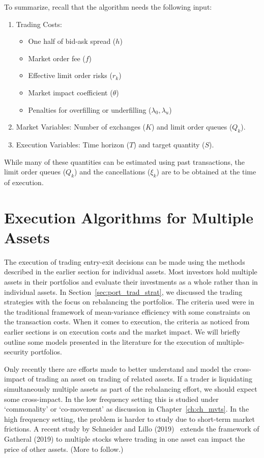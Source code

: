 To summarize, recall that the algorithm needs the following input:
	\begin{enumerate}[--]
	\item Trading Costs: 
		\begin{itemize}
		\item One half of bid-ask spread ($h$)
		\item Market order fee ($f$)
		\item Effective limit order risks ($r_k$)
		\item Market impact coefficient ($\theta$)
		\item Penalties for overfilling or underfilling ($\lambda_0,\lambda_u$)
		\end{itemize}
	\item Market Variables: Number of exchanges ($K$) and limit order queues ($Q_k$).
	\item Execution Variables: Time horizon ($T$) and target quantity ($S$).
	\end{enumerate}
While many of these quantities can be estimated using past transactions, the limit order queues ($Q_k$) and the cancellations ($\xi_k$) are to be obtained at the time of execution.



\section{Execution Algorithms for Multiple Assets}

The execution of trading entry-exit decisions can be made using the methods described in the earlier section for individual assets. Most investors hold multiple assets in their portfolios and evaluate their investments as a whole rather than in individual assets. In Section~\ref{sec:port_trad_strat}, we discussed the trading strategies with the focus on rebalancing the portfolios. The criteria used were in the traditional framework of mean-variance efficiency with some constraints on the transaction costs. When it comes to execution, the criteria as noticed from earlier sections is on execution costs and the market impact. We will briefly outline some models presented in the literature for the execution of multiple-security portfolios.


Only recently there are efforts made to better understand and model the cross-impact of trading an asset on trading of related assets. If a trader is liquidating simultaneously multiple assets as part of the rebalancing effort, we should expect some cross-impact. In the low frequency setting this is studied under `commonality' or `co-movement' as discussion in Chapter~\ref{ch:ch_mvts}. In the high frequency setting, the problem is harder to study due to short-term market frictions. A recent study by Schneider and Lillo (2019)~\cite{schnlillo19} extends the framework of Gatheral (2019) to multiple stocks where trading in one asset can impact the price of other assets. (More to follow.) 


